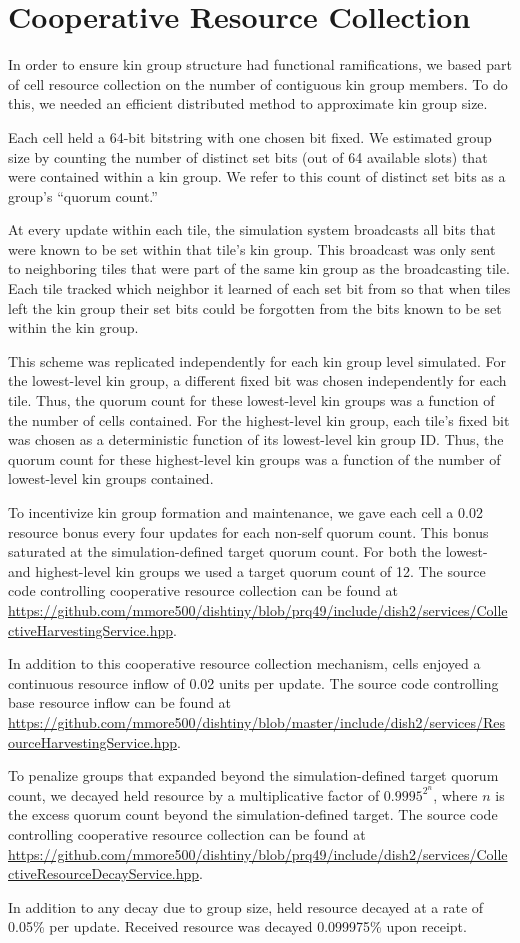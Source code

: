 \section{Cooperative Resource Collection}

In order to ensure kin group structure had functional ramifications, we based part of cell resource collection on the number of contiguous kin group members.
To do this, we needed an efficient distributed method to approximate kin group size.

Each cell held a 64-bit bitstring with one chosen bit fixed.
We estimated group size by counting the number of distinct set bits (out of 64 available slots) that were contained within a kin group.
We refer to this count of distinct set bits as a group's ``quorum count.''

At every update within each tile, the simulation system broadcasts all bits that were known to be set within that tile's kin group.
This broadcast was only sent to neighboring tiles that were part of the same kin group as the broadcasting tile.
Each tile tracked which neighbor it learned of each set bit from so that when tiles left the kin group their set bits could be forgotten from the bits known to be set within the kin group.

This scheme was replicated independently for each kin group level simulated.
For the lowest-level kin group, a different fixed bit was chosen independently for each tile.
Thus, the quorum count for these lowest-level kin groups was a function of the number of cells contained.
For the highest-level kin group, each tile's fixed bit was chosen as a deterministic function of its lowest-level kin group ID.
Thus, the quorum count for these highest-level kin groups was a function of the number of lowest-level kin groups contained.

To incentivize kin group formation and maintenance, we gave each cell a 0.02 resource bonus every four updates for each non-self quorum count.
This bonus saturated at the simulation-defined target quorum count.
For both the lowest- and highest-level kin groups we used a target quorum count of 12.
The source code controlling cooperative resource collection can be found at \url{https://github.com/mmore500/dishtiny/blob/prq49/include/dish2/services/CollectiveHarvestingService.hpp}.

In addition to this cooperative resource collection mechanism, cells enjoyed a continuous resource inflow of 0.02 units per update.
The source code controlling base resource inflow can be found at \url{https://github.com/mmore500/dishtiny/blob/master/include/dish2/services/ResourceHarvestingService.hpp}.

To penalize groups that expanded beyond the simulation-defined target quorum count, we decayed held resource by a multiplicative factor of $0.9995^{2^n}$, where $n$ is the excess quorum count beyond the simulation-defined target.
The source code controlling cooperative resource collection can be found at \url{https://github.com/mmore500/dishtiny/blob/prq49/include/dish2/services/CollectiveResourceDecayService.hpp}.

In addition to any decay due to group size, held resource decayed at a rate of 0.05\% per update.
Received resource was decayed 0.099975\% upon receipt.
